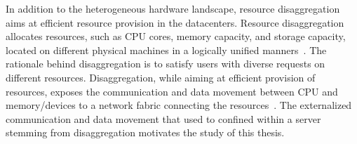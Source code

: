In addition to the heterogeneous hardware landscape, resource disaggregation aims at efficient resource provision in the datacenters.
%  
Resource disaggregation allocates resources, such as CPU cores, memory capacity, and storage capacity, located on different physical machines in a logically unified manners~\cite{
legoos:osdi:2018, far-memory:eurosys:2020, leap:atc:2020,aifm:osdi:2020,carbink:osdi:2022,hydra:fast:2022}.
%
The rationale behind disaggregation is to satisfy users with diverse requests on different resources.
%
Disaggregation, while aiming at efficient provision of resources, exposes the communication and data movement between CPU and memory/devices to a network fabric connecting the resources~\cite{kona:asplos:2021, intel-cxl:ieee-micro:2023, tpp:asplos:2023, pond:asplos:2023, aurelia:words:2023}.   
%
The externalized communication and data movement that used to confined within a server stemming from disaggregation motivates the study of this thesis. 

%
%
%


